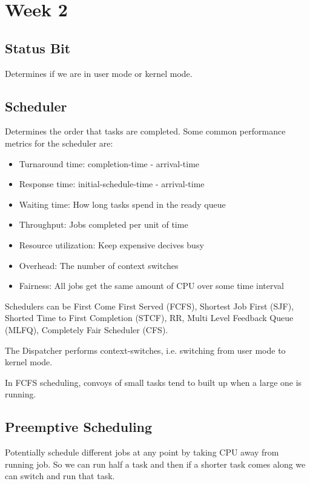 \documentclass[12pt, letterpaper]{article}
\begin{document}
\section*{Week 2}
\subsection*{Status Bit}
Determines if we are in user mode or kernel mode. 

\subsection*{Scheduler}
Determines the order that tasks 
are completed. Some common performance 
metrics for the scheduler are:
\begin{itemize}
    \item Turnaround time: completion-time - arrival-time
    \item Response time: initial-schedule-time - arrival-time 
    \item Waiting time: How long tasks spend in the ready queue 
    \item Throughput: Jobs completed per unit of time 
    \item Resource utilization: Keep expensive decives busy 
    \item Overhead: The number of context switches 
    \item Fairness: All jobs get the same amount of CPU over some time interval 
\end{itemize}

Schedulers can be First Come First Served (FCFS), 
Shortest Job First (SJF), Shorted Time to First Completion 
(STCF), RR, Multi Level Feedback Queue (MLFQ),
Completely Fair Scheduler (CFS).

The Dispatcher performs context-switches, i.e. switching from 
user mode to kernel mode. 

In FCFS scheduling, convoys of small tasks tend to built 
up when a large one is running. 

\subsection*{Preemptive Scheduling}
Potentially schedule different jobs at any point 
by taking CPU away from running job. 
So we can run half a task and then if a shorter task comes 
along we can switch and run that task. 
\end{document}

